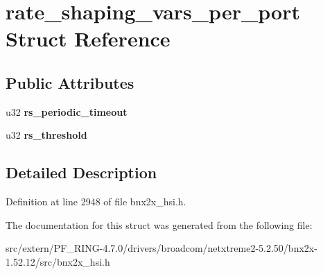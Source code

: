\hypertarget{structrate__shaping__vars__per__port}{
\section{rate\_\-shaping\_\-vars\_\-per\_\-port Struct Reference}
\label{structrate__shaping__vars__per__port}
}
\subsection*{Public Attributes}
\begin{DoxyCompactItemize}
\item 
\hypertarget{structrate__shaping__vars__per__port_a285b2c87898c0ffcfd9ceb0e7d854cec}{
u32 {\bfseries rs\_\-periodic\_\-timeout}}
\label{structrate__shaping__vars__per__port_a285b2c87898c0ffcfd9ceb0e7d854cec}

\item 
\hypertarget{structrate__shaping__vars__per__port_a8366c5b34d1245b3856db4367d2bc0d7}{
u32 {\bfseries rs\_\-threshold}}
\label{structrate__shaping__vars__per__port_a8366c5b34d1245b3856db4367d2bc0d7}

\end{DoxyCompactItemize}


\subsection{Detailed Description}


Definition at line 2948 of file bnx2x\_\-hsi.h.



The documentation for this struct was generated from the following file:\begin{DoxyCompactItemize}
\item 
src/extern/PF\_\-RING-\/4.7.0/drivers/broadcom/netxtreme2-\/5.2.50/bnx2x-\/1.52.12/src/bnx2x\_\-hsi.h\end{DoxyCompactItemize}
